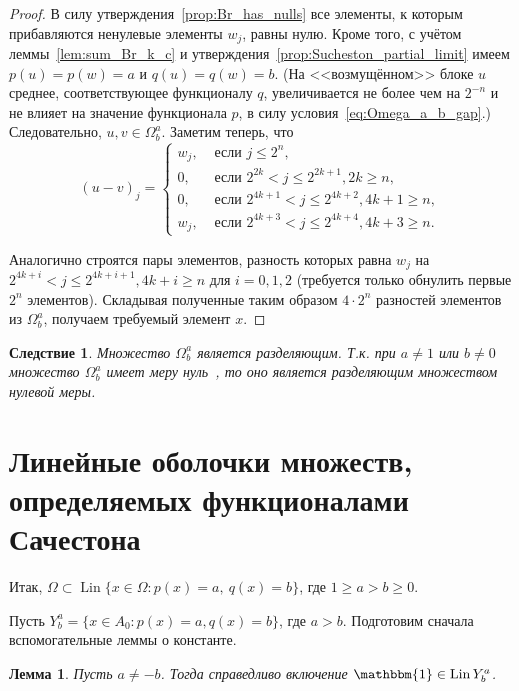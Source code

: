 \documentclass[a4paper,14pt]{article} %
\theoremstyle{plain}
\newtheorem{lemma}{Лемма}[section]
\newtheorem{corollary}{Следствие}[lemma]
\begin{document}
\begin{proof}
	В силу утверждения~\ref{prop:Br_has_nulls} все элементы, к которым прибавляются ненулевые элементы $w_j$, равны нулю.
	Кроме того, с учётом леммы~\ref{lem:sum_Br_k_c} и утверждения~\ref{prop:Sucheston_partial_limit}
	имеем $p(u)=p(w)=a$ и $q(u)=q(w)=b$.
	(На <<возмущённом>> блоке $u$ среднее, соответствующее функционалу $q$,
	увеличивается не более чем на $2^{-n}$ и не влияет на значение функционала $p$,
	в силу условия~\eqref{eq:Omega_a_b_gap}.)
	Следовательно, $u,v\in\Omega^a_b$.
	Заметим теперь, что
	\begin{equation}
		(u-v)_j = \begin{cases}
			w_j,  & \mbox{~если~} j \leq 2^n,
			\\
			0,  & \mbox{~если~} 2^{2k  } < j \leq 2^{2k+1}, 2k    \geq n,
			\\
			0,  & \mbox{~если~} 2^{4k+1} < j \leq 2^{4k+2}, 4k + 1 \geq n,
			\\
			w_j,  & \mbox{~если~} 2^{4k+3} < j \leq 2^{4k+4}, 4k + 3 \geq n
			.
		\end{cases}
	\end{equation}

	Аналогично строятся пары элементов, разность которых равна $w_j$ на $2^{4k+i} < j \leq 2^{4k+i+1}, 4k + i \geq n$ для $i=0,1,2$
	(требуется только обнулить первые $2^n$ элементов).
	Складывая полученные таким образом $4\cdot 2^n$ разностей элементов из $\Omega^a_b$, получаем требуемый элемент $x$.

\end{proof}

\begin{corollary}
	Множество $\Omega^a_b$ является разделяющим.
	Т.к. при $a\neq 1$ или $b\neq 0$ множество $\Omega^a_b$ имеет меру нуль~\cite{semenov2010characteristic,connor1990almost},
	то оно является разделяющим множеством нулевой меры.
\end{corollary}



\section{Линейные оболочки множеств, определяемых функционалами Сачестона}

Итак, $\Omega \subset \operatorname{Lin}\{x\in\Omega : p(x) = a,~ q(x) = b\}$, где $1\geq a>b\geq 0$.


Пусть $Y^a_b = \{x\in A_0 : p(x) = a, q(x) = b\}$, где $a>b$.
Подготовим сначала вспомогательные леммы о константе.

\begin{lemma}
	\label{lem:const_Lin_alpha_0}
	Пусть $a\neq -b$.
	Тогда справедливо включение
	$\mathbbm{1}\in \operatorname{Lin} Y^a_b$.
\end{lemma}
\end{document}

